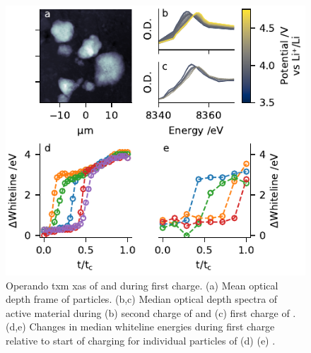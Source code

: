 \documentclass{article}
\begin{document}
\begin{figure}
  \includegraphics{figures/nmc_txm.pdf}
  \caption{Operando \gls{txm} \gls{xas} of \nmc[333]{} and \nmc[532]{}
    during first charge. (a) Mean optical depth frame of \nmc[333]{}
    particles. (b,c) Median optical depth spectra of active material
    during (b) second charge of \nmc[333]{} and (c) first charge of
    \nmc[532]{}. (d,e) Changes in median whiteline energies during
    first charge relative to start of charging for individual
    particles of (d) \nmc[333]{} (e) \nmc[532]{}.}
  \label{fig:txm-nmc}
\end{figure}
\end{document}
